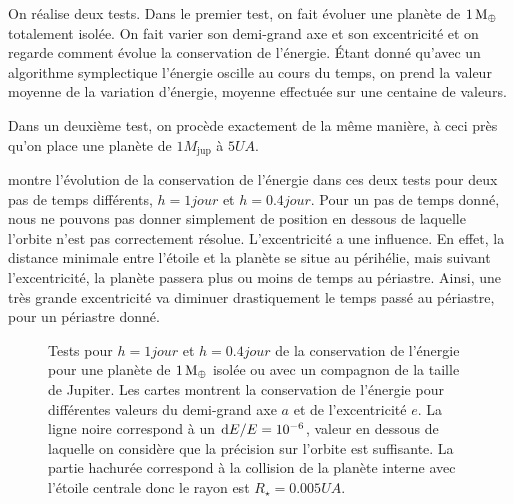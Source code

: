On réalise deux tests. Dans le premier test, on fait évoluer une planète de $1\mathrm{\thinspace M_\oplus}$ totalement isolée. On fait varier son demi-grand axe et son excentricité et on regarde comment évolue la conservation de l'énergie. Étant donné qu'avec un algorithme symplectique l'énergie oscille au cours du temps, on prend la valeur moyenne de la variation d'énergie, moyenne effectuée sur une centaine de valeurs.

Dans un deuxième test, on procède exactement de la même manière, à ceci près qu'on place une planète de $1\unit{M_\text{jup}}$ à $5\unit{UA}$. 

 montre l'évolution de la conservation de l'énergie dans ces deux tests pour deux pas de temps différents, $h=1\unit{jour}$ et $h=0.4\unit{jour}$. Pour un pas de temps donné, nous ne pouvons pas donner simplement de position en dessous de laquelle l'orbite n'est pas correctement résolue. L'excentricité a une influence. En effet, la distance minimale entre l'étoile et la planète se situe au périhélie, mais suivant l'excentricité, la planète passera plus ou moins de temps au périastre. Ainsi, une très grande excentricité va diminuer drastiquement le temps passé au périastre, pour un périastre donné. 

\begin{figure}[htb]
\centering
{}\hfill
{}

\hfill
{}


\caption{Tests pour $h=1\unit{jour}$ et $h=0.4\unit{jour}$ de la conservation de l'énergie pour une planète de $1\mathrm{\thinspace M_\oplus}$ isolée ou avec un compagnon de la taille de Jupiter. Les cartes montrent la conservation de l'énergie pour différentes valeurs du demi-grand axe $a$ et de l'excentricité $e$. La ligne noire correspond à un $\operatorname{d \!} E/E=10^{-6}$, valeur en dessous de laquelle on considère que la précision sur l'orbite est suffisante. La partie hachurée correspond à la collision de la planète interne avec l'étoile centrale donc le rayon est $R_\star=0.005\unit{UA}$.}\label{fig:accuracy_maps}
\end{figure}

